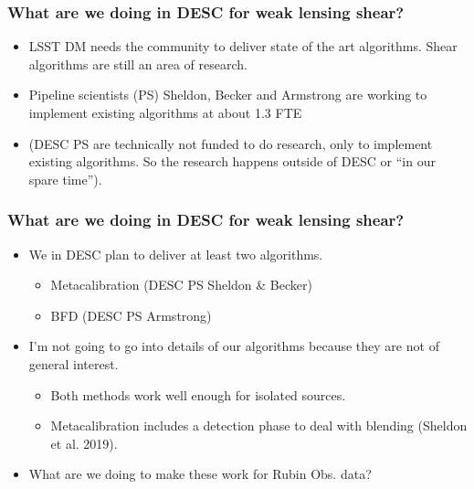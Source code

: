 \documentclass{beamer}
\begin{document}
\frame
{

    \frametitle{What are we doing in DESC for weak lensing shear?}


    \begin{itemize}

        \item LSST DM needs the community to deliver state of the art algorithms.
            Shear algorithms are still an area of research.

        \item Pipeline scientists (PS) Sheldon, Becker and Armstrong
            are working to implement existing algorithms at about 1.3 FTE
            
        \item (DESC PS are technically not funded to do research, only to
            implement existing algorithms.  So the research happens outside of
            DESC or ``in our spare time'').


    \end{itemize}

}




\frame
{

    \frametitle{What are we doing in DESC for weak lensing shear?}


    \begin{itemize}

        \item We in DESC plan to deliver at least two algorithms.

            \begin{itemize}
                \item Metacalibration (DESC PS Sheldon \& Becker)
                \item BFD (DESC PS Armstrong)
            \end{itemize}

        \item I'm not going to go into details of our algorithms because they
            are not of general interest.
            \begin{itemize}

                \item Both methods work well enough for isolated sources.
                    
                \item Metacalibration includes a detection phase to deal with
                    blending (Sheldon et al. 2019).
            \end{itemize}

        \item What are we doing to make these work for Rubin Obs. data?

    \end{itemize}

}
\end{document}

